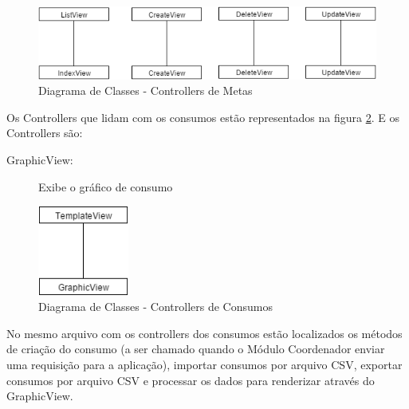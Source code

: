 \begin{figure}
\centering
\includegraphics[width=14cm,keepaspectratio]{figuras/diagrama_cont_goal.png}
\caption{\label{fig:diagrama-cont-goal} Diagrama de Classes - Controllers de Metas}
\end{figure}

Os Controllers que lidam com os consumos estão representados na figura \ref{fig:diagrama-cont-consumption}. E os Controllers são:
\begin{description}
	\item[GraphicView:] Exibe o gráfico de consumo
\end{description} 

\begin{figure}
\centering
\includegraphics[width=3cm,keepaspectratio]{figuras/diagrama_cont_consumption.png}
\caption{\label{fig:diagrama-cont-consumption} Diagrama de Classes - Controllers de Consumos}
\end{figure}

No mesmo arquivo com os controllers dos consumos estão localizados os métodos de criação do consumo (a ser chamado quando o Módulo Coordenador enviar uma requisição para a aplicação), importar consumos por arquivo CSV, exportar consumos por arquivo CSV e processar os dados para renderizar através do GraphicView.